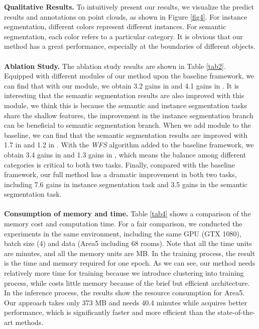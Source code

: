 \documentclass{cta-author}
\begin{document}
\textbf{Qualitative Results.} To intuitively present our results, we visualize the predict results and annotations on point clouds, as shown in Figure \ref{fig4}. For instance segmentation, different colors represent different instances. For semantic segmentation, each color refers to a particular category. It is obvious that our method has a great performance, especially at the boundaries of different objects.\\ \hspace*{\fill} \\
\textbf{Ablation Study.} The ablation study results are shown in Table \ref{tab2}. Equipped with different modules of our method upon the baseline framework, we can find that with our  module, we obtain 3.2 gains in  and 4.1 gains in . It is interesting that the semantic segmentation results are also improved with this module, we think this is because the semantic and instance segmentation tasks share the shallow features, the improvement in the instance segmentation branch can be beneficial to semantic segmentation branch. When we add  module to the baseline, we can find that the semantic segmentation results are improved with 1.7 in  and 1.2 in . With the \textit{WFS} algorithm added to the baseline framework, we obtain 3.4 gains in  and 1.3 gains in , which means the balance among different categories is critical to both two tasks. Finally, compared with the baseline framework, our full method has a dramatic improvement in both two tasks, including 7.6  gains in instance segmentation task and 3.5  gains in the semantic segmentation task.\\ \hspace*{\fill} \\
\textbf{Consumption of memory and time.} Table \ref{tab4} shows a comparison of the memory cost and computation time. For a fair comparison, we conducted the experiments in the same environment, including the same GPU (GTX 1080), batch size (4) and data (Area5 including 68 rooms).
Note that all the time units are minutes, and all the memory units are MB. In the training process, the result is the time and memory required for one epoch. As we can see, our method needs relatively more time for training because we introduce clustering into training process, while costs little memory because of the brief but efficient architecture. In the inference process, the results show the resource consumption for Area5. Our approach takes only 373 MB and needs 40.4 minutes while acquires better performance, which is significantly faster and more efficient than the state-of-the-art methods.
\end{document}
